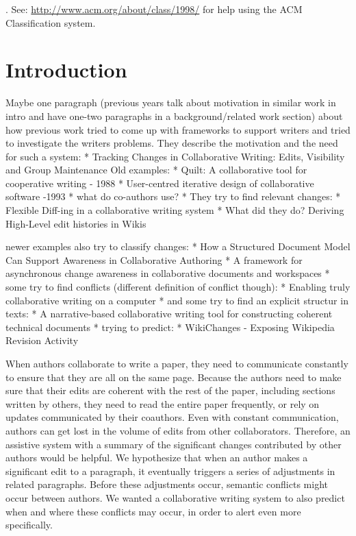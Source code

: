 . See: \url{http://www.acm.org/about/class/1998/} for help using the ACM
Classification system.

\section{Introduction}\label{introduction}

Maybe one paragraph (previous years talk about motivation in similar
work in intro and have one-two paragraphs in a background/related work
section) about how previous work tried to come up with frameworks to
support writers and tried to investigate the writers problems. They
describe the motivation and the need for such a system: * Tracking
Changes in Collaborative Writing: Edits, Visibility and Group
Maintenance Old examples: * Quilt: A collaborative tool for cooperative
writing - 1988 * User-centred iterative design of collaborative software
-1993 * what do co-authors use? * They try to find relevant changes: *
Flexible Diff-ing in a collaborative writing system * What did they do?
Deriving High-Level edit histories in Wikis

newer examples also try to classify changes: * How a Structured Document
Model Can Support Awareness in Collaborative Authoring * A framework for
asynchronous change awareness in collaborative documents and workspaces
* some try to find conflicts (different definition of conflict though):
* Enabling truly collaborative writing on a computer * and some try to
find an explicit structur in texts: * A narrative-based collaborative
writing tool for constructing coherent technical documents * trying to
predict: * WikiChanges - Exposing Wikipedia Revision Activity

When authors collaborate to write a paper, they need to communicate
constantly to ensure that they are all on the same page. Because the
authors need to make sure that their edits are coherent with the rest of
the paper, including sections written by others, they need to read the
entire paper frequently, or rely on updates communicated by their
coauthors. Even with constant communication, authors can get lost in the
volume of edits from other collaborators. Therefore, an assistive system
with a summary of the significant changes contributed by other authors
would be helpful. We hypothesize that when an author makes a significant
edit to a paragraph, it eventually triggers a series of adjustments in
related paragraphs. Before these adjustments occur, semantic conflicts
might occur between authors. We wanted a collaborative writing system to
also predict when and where these conflicts may occur, in order to alert
even more specifically.


